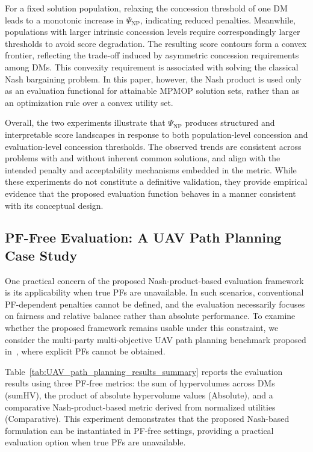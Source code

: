 \documentclass[journal]{IEEEtran}
\begin{document}
For a fixed solution population, relaxing the concession threshold of one DM leads to a monotonic increase in $\Psi_{\mathrm{NP}}$, indicating reduced penalties. Meanwhile, populations with larger intrinsic concession levels require correspondingly larger thresholds to avoid score degradation. The resulting score contours form a convex frontier, reflecting the trade-off induced by asymmetric concession requirements among DMs. This convexity requirement is associated with solving the classical Nash bargaining problem. In this paper, however, the Nash product is used only as an evaluation functional for attainable MPMOP solution sets, rather than as an optimization rule over a convex utility set.

Overall, the two experiments illustrate that $\Psi_{\mathrm{NP}}$ produces structured and interpretable score landscapes in response to both population-level concession and evaluation-level concession thresholds. The observed trends are consistent across problems with and without inherent common solutions, and align with the intended penalty and acceptability mechanisms embedded in the metric. While these experiments do not constitute a definitive validation, they provide empirical evidence that the proposed evaluation function behaves in a manner consistent with its conceptual design.

\subsection{PF-Free Evaluation: A UAV Path Planning Case Study}

One practical concern of the proposed Nash-product-based evaluation framework is its applicability when true PFs are unavailable. In such scenarios, conventional PF-dependent penalties cannot be defined, and the evaluation necessarily focuses on fairness and relative balance rather than absolute performance. To examine whether the proposed framework remains usable under this constraint, we consider the multi-party multi-objective UAV path planning benchmark proposed in~\cite{chen2024evolutionary}, where explicit PFs cannot be obtained.

Table~\ref{tab:UAV_path_planning_results_summary} reports the evaluation results using three PF-free metrics: the sum of hypervolumes across DMs (sumHV), the product of absolute hypervolume values (Absolute), and a comparative Nash-product-based metric derived from normalized utilities (Comparative). This experiment demonstrates that the proposed Nash-based formulation can be instantiated in PF-free settings, providing a practical evaluation option when true PFs are unavailable.
\end{document}
